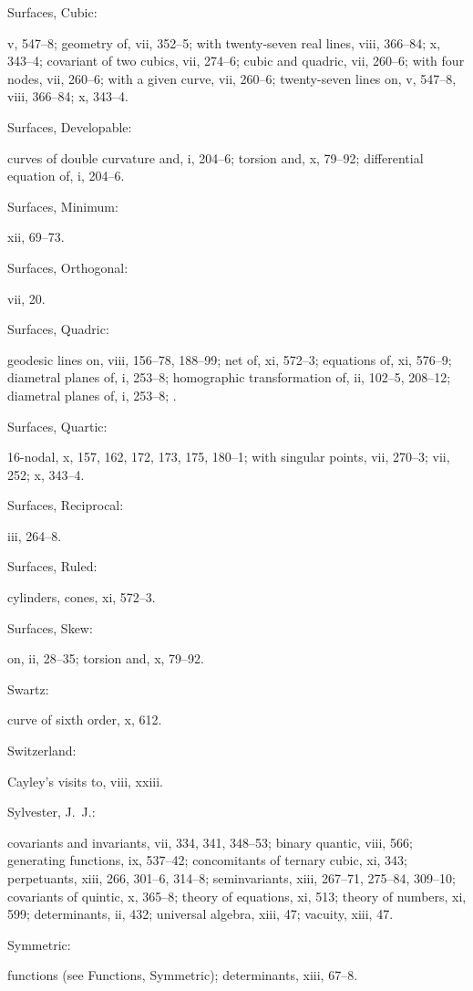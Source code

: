 \documentclass[11pt,a4paper]{book}
\providecommand{\V}[1]{#1}
\providecommand{\IndexEntry}[2]{#1\dotfill #2\par}
\begin{document}
\IndexEntry{Surfaces, Cubic}: \V{v}, 547--8; geometry of, \V{vii}, 352--5; with twenty-seven real lines, \V{viii}, 366--84; \V{x}, 343--4; covariant of two cubics, \V{vii}, 274--6; cubic and quadric, \V{vii}, 260--6; with four nodes, \V{vii}, 260--6; with a given curve, \V{vii}, 260--6; twenty-seven lines on, \V{v}, 547--8, \V{viii}, 366--84; \V{x}, 343--4.

\IndexEntry{Surfaces, Developable}: curves of double curvature and, \V{i}, 204--6; torsion and, \V{x}, 79--92; differential equation of, \V{i}, 204--6.

\IndexEntry{Surfaces, Minimum}: \V{xii}, 69--73.

\IndexEntry{Surfaces, Orthogonal}: \V{vii}, 20.

\IndexEntry{Surfaces, Quadric}: geodesic lines on, \V{viii}, 156--78, 188--99; net of, \V{xi}, 572--3; equations of, \V{xi}, 576--9; diametral planes of, \V{i}, 253--8; homographic transformation of, \V{ii}, 102--5, 208--12; diametral planes of, \V{i}, 253--8; .

\IndexEntry{Surfaces, Quartic}: 16-nodal, \V{x}, 157, 162, 172, 173, 175, 180--1; with singular points, \V{vii}, 270--3; \V{vii}, 252; \V{x}, 343--4.

\IndexEntry{Surfaces, Reciprocal}: \V{iii}, 264--8.

\IndexEntry{Surfaces, Ruled}: cylinders, cones, \V{xi}, 572--3.

\IndexEntry{Surfaces, Skew}: on, \V{ii}, 28--35; torsion and, \V{x}, 79--92.

\IndexEntry{Swartz}: curve of sixth order, \V{x}, 612.

\IndexEntry{Switzerland}: Cayley's visits to, \V{viii}, xxiii.

\IndexEntry{Sylvester, J.\ J.}: covariants and invariants, \V{vii}, 334, 341, 348--53; binary quantic, \V{viii}, 566; generating functions, \V{ix}, 537--42; concomitants of ternary cubic, \V{xi}, 343; perpetuants, \V{xiii}, 266, 301--6, 314--8; seminvariants, \V{xiii}, 267--71, 275--84, 309--10; covariants of quintic, \V{x}, 365--8; theory of equations, \V{xi}, 513; theory of numbers, \V{xi}, 599; determinants, \V{ii}, 432; universal algebra, \V{xiii}, 47; vacuity, \V{xiii}, 47.

\IndexEntry{Symmetric}: functions (see Functions, Symmetric); determinants, \V{xiii}, 67--8.

\newpage

\setcounter{page}{126}
\end{document}
